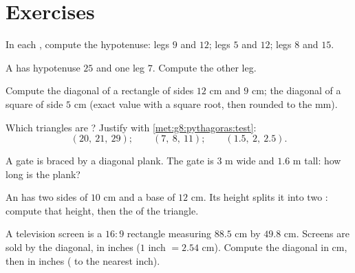 \section{Exercises}

\begin{exercise}[$\star$]\label{exo:g8:pythagoras:1}
In each , compute the hypotenuse:
legs $9$ and $12$; \quad legs $5$ and $12$; \quad legs $8$ and $15$.
\end{exercise}

\begin{exercise}[$\star$]\label{exo:g8:pythagoras:2}
A  has hypotenuse $25$ and one leg $7$. Compute the
other leg.
\end{exercise}

\begin{exercise}[$\star$]\label{exo:g8:pythagoras:3}
Compute the diagonal of a rectangle of sides $12$ cm and $9$ cm; the
diagonal of a square of side $5$ cm (exact value with a square root,
then rounded to the mm).
\end{exercise}

\begin{exercise}[$\star$]\label{exo:g8:pythagoras:4}
Which triangles are ? Justify with
\cref{met:g8:pythagoras:test}:
\[
(20,\ 21,\ 29); \qquad
(7,\ 8,\ 11); \qquad
(1.5,\ 2,\ 2.5).
\]
\end{exercise}

\begin{exercise}[$\star$]\label{exo:g8:pythagoras:5}
A gate is braced by a diagonal plank. The gate is $3$ m wide and
$1.6$ m tall: how long is the plank?
\end{exercise}

\begin{exercise}[$\star$]\label{exo:g8:pythagoras:6}
An  has two sides of $10$ cm and a base of $12$ cm.
Its height splits it into two : compute that height,
then the  of the triangle.
\end{exercise}

\begin{exercise}[$\star\star$]\label{exo:g8:pythagoras:7}
A television screen is a $16{:}9$ rectangle measuring $88.5$ cm by
$49.8$ cm. Screens are sold by the diagonal, in inches
($1$ inch $= 2.54$ cm). Compute the diagonal in cm, then in inches
( to the nearest inch).
\end{exercise}

